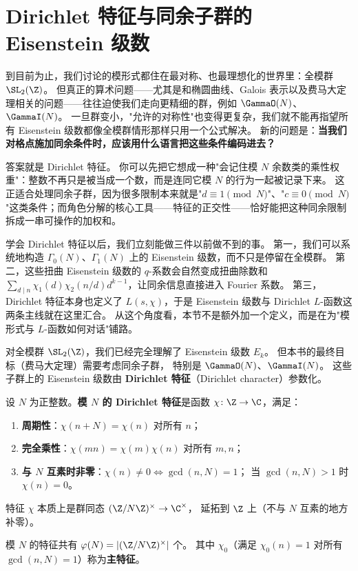 \section{Dirichlet 特征与同余子群的 Eisenstein 级数}
\label{sec:eisenstein-congruence}

到目前为止，我们讨论的模形式都住在最对称、也最理想化的世界里：全模群 $\SL_2(\Z)$。
但真正的算术问题——尤其是和椭圆曲线、Galois 表示以及费马大定理相关的问题——往往迫使我们走向更精细的群，例如 $\GammaO(N)$、$\GammaI(N)$。
一旦群变小，"允许的对称性"也变得更复杂，我们就不能再指望所有 Eisenstein 级数都像全模群情形那样只用一个公式解决。
新的问题是：\textbf{当我们对格点施加同余条件时，应该用什么语言把这些条件编码进去？}

答案就是 Dirichlet 特征。
你可以先把它想成一种"会记住模 $N$ 余数类的乘性权重"：整数不再只是被当成一个数，而是连同它模 $N$ 的行为一起被记录下来。
这正适合处理同余子群，因为很多限制本来就是"$d\equiv 1\pmod N$"、"$c\equiv 0\pmod N$"这类条件；而角色分解的核心工具——特征的正交性——恰好能把这种同余限制拆成一串可操作的加权和。

学会 Dirichlet 特征以后，我们立刻能做三件以前做不到的事。
第一，我们可以系统地构造 $\Gamma_0(N)$、$\Gamma_1(N)$ 上的 Eisenstein 级数，而不只是停留在全模群。
第二，这些扭曲 Eisenstein 级数的 $q$-系数会自然变成扭曲除数和
$\sum_{d\mid n}\chi_1(d)\chi_2(n/d)d^{k-1}$，让同余信息直接进入 Fourier 系数。
第三，Dirichlet 特征本身也定义了 $L(s,\chi)$，于是 Eisenstein 级数与 Dirichlet $L$-函数这两条主线就在这里汇合。
从这个角度看，本节不是额外加一个定义，而是在为"模形式与 $L$-函数如何对话"铺路。

对全模群 $\SL_2(\Z)$，我们已经完全理解了 Eisenstein 级数 $E_k$。
但本书的最终目标（费马大定理）需要考虑同余子群，
特别是 $\GammaO(N)$、$\GammaI(N)$。
这些子群上的 Eisenstein 级数由 \textbf{Dirichlet 特征}（Dirichlet character）参数化。

\begin{definition}[Dirichlet 特征]
\label{def:dirichlet-character}
设 $N$ 为正整数。\textbf{模 $N$ 的 Dirichlet 特征}是函数 $\chi\colon \Z \to \C$，满足：
\begin{enumerate}
  \item \textbf{周期性}：$\chi(n + N) = \chi(n)$ 对所有 $n$；
  \item \textbf{完全乘性}：$\chi(mn) = \chi(m)\chi(n)$ 对所有 $m, n$；
  \item \textbf{与 $N$ 互素时非零}：$\chi(n) \neq 0 \iff \gcd(n, N) = 1$；
    当 $\gcd(n, N) > 1$ 时 $\chi(n) = 0$。
\end{enumerate}
特征 $\chi$ 本质上是群同态 $(\Z/N\Z)^\times \to \C^\times$，
延拓到 $\Z$ 上（不与 $N$ 互素的地方补零）。

模 $N$ 的特征共有 $\varphi(N) = |(\Z/N\Z)^\times|$ 个。
其中 $\chi_0$（满足 $\chi_0(n) = 1$ 对所有 $\gcd(n,N)=1$）称为\textbf{主特征}。
\end{definition}

